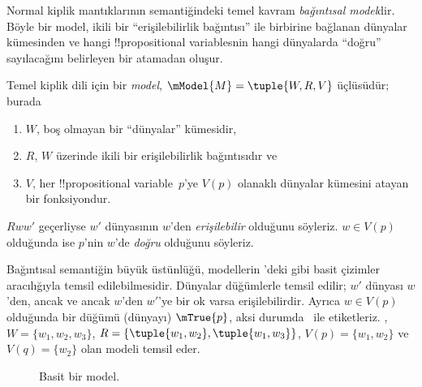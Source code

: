 



Normal kiplik mantıklarının semantiğindeki temel kavram \emph{bağıntısal
model}dir. Böyle bir model, ikili bir ``erişilebilirlik bağıntısı'' ile
birbirine bağlanan dünyalar kümesinden ve hangi !!{propositional variable}s{}nin
hangi dünyalarda ``doğru'' sayılacağını belirleyen bir atamadan oluşur.

\begin{defn}
  Temel kiplik dili için bir \emph{model}, $\mModel{M} = \tuple{W, R, V}$
  üçlüsüdür; burada
  \begin{enumerate}
  \item $W$, boş olmayan bir ``dünyalar'' kümesidir,
  \item $R$, $W$ üzerinde ikili bir erişilebilirlik bağıntısıdır ve
  \item $V$, her !!{propositional variable}~$p$'ye $V(p)$ olanaklı
    dünyalar kümesini atayan bir fonksiyondur.
  \end{enumerate}
  $Rww'$ geçerliyse $w'$ dünyasının $w$'den \emph{erişilebilir} olduğunu
  söyleriz. $w \in V(p)$ olduğunda ise $p$'nin $w$'de \emph{doğru}
  olduğunu söyleriz.
\end{defn}

Bağıntısal semantiğin büyük üstünlüğü, modellerin 'deki
gibi basit çizimler aracılığıyla temsil edilebilmesidir. Dünyalar düğümlerle
temsil edilir; $w'$ dünyası $w$'den, ancak ve ancak $w$'den $w'$'ye bir ok
varsa erişilebilirdir. Ayrıca $w \in V(p)$ olduğunda bir düğümü (dünyayı)
$\mTrue{p}$, aksi durumda~ ile etiketleriz.
, $W = \{w_1, w_2, w_3\}$,
$R = \{\tuple{w_1, w_2},\tuple{w_1, w_3}\}$,
$V(p) = \{w_1, w_2\}$ ve $V(q) = \{w_2\}$ olan modeli temsil eder.

\begin{figure}
  \begin{center}
  \end{center}
  \caption{Basit bir model.}
\end{figure}

